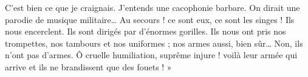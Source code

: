 {C’est bien ce que je craignais. J’entends une cacophonie barbare. On dirait une parodie de musique militaire… Au secours ! ce sont eux, ce sont les singes ! Ils nous encerclent. Ils sont dirigés par d’énormes gorilles. Ils nous ont pris nos trompettes, nos tambours et nos uniformes ; nos armes aussi, bien sûr… Non, ils n’ont pas d’armes. Ô cruelle humiliation, suprême injure ! voilà leur armée qui arrive et ils ne brandissent que des fouets ! »
}

%

%

%

%

%
